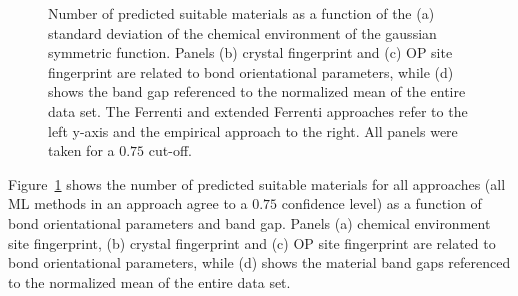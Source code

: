 \documentclass[superscriptaddress,unsortedaddress,
 amsmath,amssymb,
 aps,
]{revtex4-2}
\begin{document}
\begin{figure}[ht!]
\begin{subfigure}[t]{1\textwidth}
    
\end{subfigure}
\begin{subfigure}[b]{0.45\textwidth}
    \scalebox{0.85}{}
    \subcaption{}
\end{subfigure}
\begin{subfigure}[b]{0.45\textwidth}
    \scalebox{0.85}{}
    \subcaption{}
\end{subfigure}%

\begin{subfigure}[b]{0.45\textwidth}
    \scalebox{0.85}{}
    \subcaption{}
\end{subfigure}
\begin{subfigure}[b]{0.45\textwidth}
    \scalebox{0.85}{}
    \subcaption{}
\end{subfigure}
\caption{Number of predicted suitable materials as a function of the (a) standard deviation of the chemical environment of the gaussian symmetric function. Panels (b) crystal fingerprint and (c) OP site fingerprint are related to bond orientational parameters, while (d) shows the band gap referenced to the normalized mean of the entire data set. 
The Ferrenti and extended Ferrenti approaches refer to the left y-axis and the empirical approach to the right. All panels were taken for a $0.75$ cut-off. }
\label{fig:histograms_supp2}
\end{figure}

Figure~\ref{fig:histograms_supp2} shows the number of predicted suitable materials for all approaches (all ML methods in an approach agree to a $0.75$ confidence level) as a function of bond orientational parameters and band gap. 
Panels (a) chemical environment site fingerprint, (b) crystal fingerprint and (c) OP site fingerprint are related to bond orientational parameters, while (d) shows the material band gaps referenced to the normalized mean of the entire data set.  

\newpage 

\end{document}
